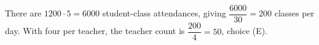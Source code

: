 There are $1200\cdot5=6000$ student-class attendances, giving $\dfrac{6000}{30}=200$ classes per day. With four per teacher, the teacher count is $\dfrac{200}{4}=\boxed{50}$, choice (E).
